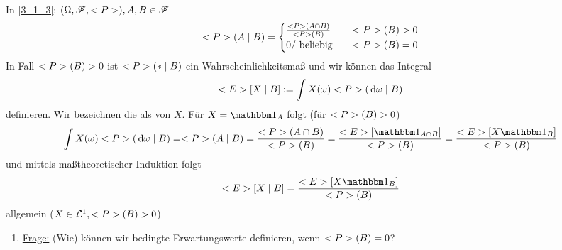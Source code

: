 In \cref{3_1_3}: $(\O, \F, \P), A,B \in \F$ %
\begin{align*}
	\P(A \mid B) = \begin{cases}
	\frac{\P(A \cap B)}{\P(B)} &\quad \P(B) > 0\\
	0/ \text{ beliebig} &\quad \P(B) = 0
	\end{cases}
\end{align*}
In Fall $\P(B) > 0$ ist $\P(\ast\mid B)$ ein Wahrscheinlichkeitsmaß und wir können das Integral 
\[
	\E[X \mid B] := \int X(\omega) \P(\d \omega \mid B)
\]
definieren. Wir bezeichnen die als  von $X$. Für $X= \indi_{A}$ folgt (für $\P(B) > 0$)
\[
	\int X(\omega) \P(\d \omega \mid B) = \P (A \mid B) = \frac{\P(A \cap B)}{\P(B)} = \frac{\E[\indi_{A\cap B}]}{\P(B)} = \frac{\E[X \indi_{B}]}{\P(B)}
\]
und mittels maßtheoretischer Induktion folgt
\begin{align*}
	\E[X \mid B] = \frac{\E[X \indi_B]}{\P(B)}
\end{align*}
allgemein ($X \in \Ln{1}, \P(B) > 0$)
\begin{enumerate}[label=]
	\item \ul{Frage:} (Wie) können wir bedingte Erwartungswerte definieren, wenn $\P(B) = 0$?
\end{enumerate}
